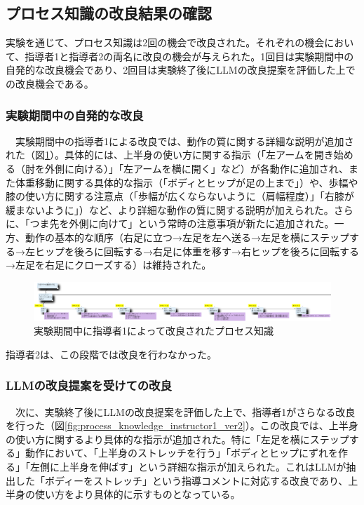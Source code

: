 \subsection{プロセス知識の改良結果の確認}
実験を通じて、プロセス知識は2回の機会で改良された。それぞれの機会において、指導者1と指導者2の両名に改良の機会が与えられた。1回目は実験期間中の自発的な改良機会であり、2回目は実験終了後にLLMの改良提案を評価した上での改良機会である。\\

\subsubsection{実験期間中の自発的な改良}
　実験期間中の指導者1による改良では、動作の質に関する詳細な説明が追加された（図\ref{fig:process_knowledge_instructor1_ver1}）。具体的には、上半身の使い方に関する指示（「左アームを開き始める（肘を外側に向ける）」「左アームを横に開く」など）が各動作に追加され、また体重移動に関する具体的な指示（「ボディとヒップが足の上まで」）や、歩幅や膝の使い方に関する注意点（「歩幅が広くならないように（肩幅程度）」「右膝が緩まないように」）など、より詳細な動作の質に関する説明が加えられた。さらに、「つま先を外側に向けて」という常時の注意事項が新たに追加された。一方、動作の基本的な順序（右足に立つ→左足を左へ送る→左足を横にステップする→左ヒップを後ろに回転する→右足に体重を移す→右ヒップを後ろに回転する→左足を右足にクローズする）は維持された。

\begin{figure}[htbp]
    \centering
    \includegraphics[width=1.0\linewidth]{./image/process_knowledge_instructor1_ver1.png}
    \caption{実験期間中に指導者1によって改良されたプロセス知識}
    \label{fig:process_knowledge_instructor1_ver1}
\end{figure}

指導者2は、この段階では改良を行わなかった。

\subsubsection{LLMの改良提案を受けての改良}
　次に、実験終了後にLLMの改良提案を評価した上で、指導者1がさらなる改良を行った（図\ref{fig:process_knowledge_instructor1_ver2}）。この改良では、上半身の使い方に関するより具体的な指示が追加された。特に「左足を横にステップする」動作において、「上半身のストレッチを行う」「ボディとヒップにずれを作る」「左側に上半身を伸ばす」という詳細な指示が加えられた。これはLLMが抽出した「ボディーをストレッチ」という指導コメントに対応する改良であり、上半身の使い方をより具体的に示すものとなっている。\\

